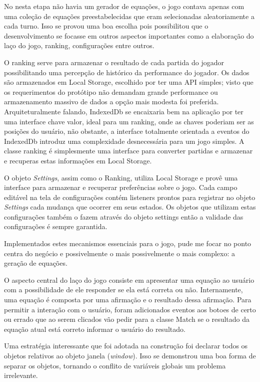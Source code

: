 \begin{draft}
No nesta etapa não havia um gerador de equações, o jogo
contava apenas com uma coleção de equações preestabelecidas que eram
selecionadas aleatoriamente a cada turno. Isso se provou uma boa escolha
pois possibilitou que o desenvolvimento se focasse em outros aspectos
importantes como a elaboração do laço do jogo, ranking, configurações entre outros.

O ranking serve para armazenar o resultado de cada partida do jogador
possibilitando uma percepção de histórico da performance do jogador.
Os dados são armazenados em Local Storage, escolhido por
ter uma API simples; visto que os requerimentos do protótipo não
demandam grande performance ou armazenamento massivo de dados a opção
mais modesta foi preferida. Arquiteturalmente falando, IndexedDb se
encaixaria bem na aplicação por ter uma interface chave valor,
ideal para um ranking, onde as chaves poderiam ser as posições do usuário,
não obstante, a interface totalmente orientada a eventos do IndexedDb
introduz uma complexidade desnecessária para um jogo simples.
A classe ranking é simplesmente uma interface para converter partidas e armazenar
e recuperas estas informações em Local Storage.

O objeto \textit{Settings}, assim como o Ranking, utiliza Local Storage
e provê uma interface para armazenar e recuperar preferências sobre o jogo.
Cada campo editável na tela de configurações contém listeners prontos
para registrar no objeto \textit{Settings} cada mudança que ocorrer em seus estados.
Os objetos que utilizam estas configurações também o fazem através do objeto settings
então a validade das configurações é sempre garantida.


Implementados estes mecanismos essenciais para o jogo, pude me focar no 
ponto centra do negócio e possivelmente o mais possivelmente o mais complexo: a geração de equações.

O aspecto central do laço do jogo consiste em apresentar uma equação
ao usuário com a possibilidade de ele responder se ela está correta ou
não. Internamente, uma equação é composta por uma afirmação e o
resultado dessa afirmação. Para permitir a interação com o usuário,
foram adicionados eventos aos botoes de certo ou errado que ao serem
clicados vão pedir para a classe Match se o resultado da equação atual
está correto informar o usuário do resultado.

Uma estratégia interessante que foi adotada na construção foi
declarar todos os objetos relativos ao objeto janela (\textit{window}).
Isso se demonstrou uma boa forma de separar os objetos, tornando o
conflito de variáveis globais um problema irrelevante.


\end{draft}

